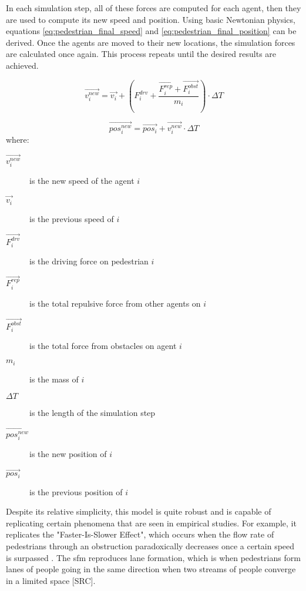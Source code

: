 \documentclass[twoside, 11pt]{article}
\begin{document}
In each simulation step, all of these forces are computed for each agent, then they are used to compute its new speed and position. Using basic Newtonian physics, equations \eqref{eq:pedestrian_final_speed} and \eqref{eq:pedestrian_final_position} can be derived. Once the agents are moved to their new locations, the simulation forces are calculated once again. This process repeats until the desired results are achieved.

\begin{equation}
  \vec{v_i^{new}} = \vec{v_i} + ( F_i^{drv} + \frac{\vec{F_i^{rep}} + \vec{F_i^{obst}}}{m_i} ) \cdot \Delta T
  \label{eq:pedestrian_final_speed}
\end{equation}

\begin{equation}
  \vec{pos_i^{new}} = \vec{pos_i} + \vec{v_i^{new}} \cdot \Delta T
  \label{eq:pedestrian_final_position}
\end{equation}
where:
\begin{description}
  \item[$\vec{v_i^{new}}$] is the new speed of the agent $i$
  \item[$\vec{v_i}$] is the previous speed of $i$
  \item[$\vec{F_i^{drv}}$] is the driving force on pedestrian $i$
  \item[$\vec{F_i^{rep}}$] is the total repulsive force from other agents on $i$
  \item[$\vec{F_i^{obst}}$] is the total force from obstacles on agent $i$
  \item[$m_i$] is the mass of $i$ 
  \item[$\Delta T$] is the length of the simulation step
  \item[$\vec{pos_i^{new}}$] is the new position of $i$
  \item[$\vec{pos_i}$] is the previous position of $i$
\end{description}

Despite its relative simplicity, this model is quite robust and is capable of replicating certain phenomena that are seen in empirical studies. For example, it replicates the "Faster-Is-Slower Effect", which occurs when the flow rate of pedestrians through an obstruction paradoxically decreases once a certain speed is surpassed \cite{helbingSimulatingDynamicFeatures2000}. The \gls{sfm} reproduces lane formation, which is when pedestrians form lanes of people going in the same direction when two streams of people converge in a limited space [SRC].
\end{document}
